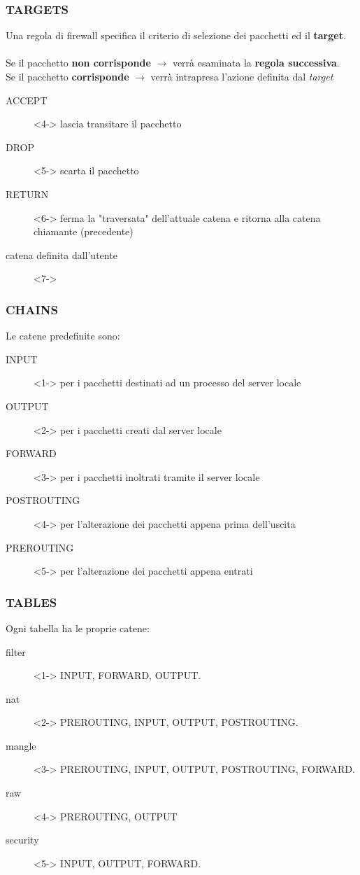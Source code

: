 \documentclass{beamer}
\begin{document}
\begin{frame}
    \frametitle{TARGETS}

    Una regola di firewall specifica il criterio di selezione dei pacchetti ed il \textbf{target}.
    \\~\\
     {Se il pacchetto \textbf{non corrisponde} $\rightarrow$ verrà esaminata la \textbf{regola successiva}.}\\
     {Se il pacchetto \textbf{corrisponde} $\rightarrow$ verrà intrapresa l'azione definita dal \textit{target}}
    \begin{description}
        \item[ACCEPT] <4-> lascia transitare il pacchetto
        \item[DROP] <5-> scarta il pacchetto
        \item[RETURN] <6-> ferma la "traversata" dell'attuale catena e ritorna alla catena chiamante (precedente)
        \item[catena definita dall'utente] <7->
    \end{description}

\end{frame}


\begin{frame}
    \frametitle{CHAINS}

    Le catene predefinite sono:
    \begin{description}
        \item[INPUT]<1-> per i pacchetti destinati ad un processo del server locale
        \item[OUTPUT]<2-> per i pacchetti creati dal server locale
        \item[FORWARD]<3-> per i pacchetti inoltrati tramite il server locale
        \item[POSTROUTING]<4-> per l'alterazione dei pacchetti appena prima dell'uscita
        \item[PREROUTING]<5-> per l'alterazione dei pacchetti appena entrati
    \end{description}

\end{frame}


\begin{frame}
    \frametitle{TABLES}
    Ogni tabella ha le proprie catene:
    \begin{description}
        \item[filter]<1-> INPUT, FORWARD, OUTPUT.
        \item[nat]<2-> PREROUTING, INPUT, OUTPUT, POSTROUTING.
        \item[mangle]<3-> PREROUTING, INPUT, OUTPUT, POSTROUTING, FORWARD.
        \item[raw]<4-> PREROUTING, OUTPUT
        \item[security]<5-> INPUT, OUTPUT, FORWARD.
    \end{description}
\end{frame}
\end{document}

